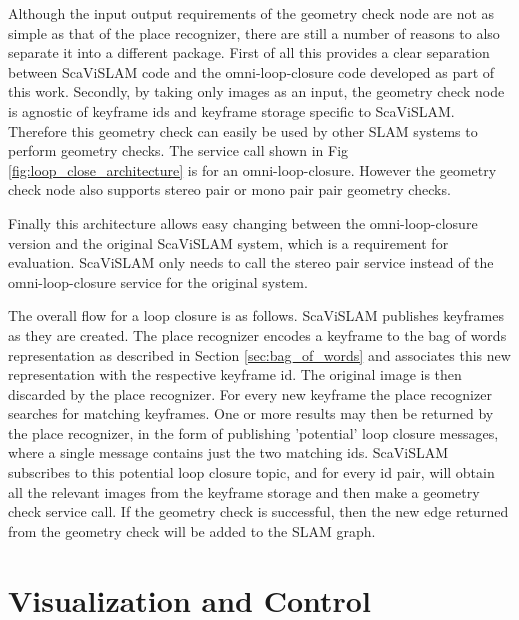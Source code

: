 Although the input output requirements of the geometry check node are not as simple as that of the place recognizer, there are still a number of reasons to also separate it into a different package.  First of all this provides a clear separation between ScaViSLAM code and the omni-loop-closure code developed as part of this work.  Secondly, by taking only images as an input, the geometry check node is agnostic of keyframe ids and keyframe storage specific to ScaViSLAM.  Therefore this geometry check can easily be used by other SLAM systems to perform geometry checks.  The service call shown in Fig \ref{fig:loop_close_architecture} is for an omni-loop-closure.  However the geometry check node also supports stereo pair or mono pair pair geometry checks.  

Finally this architecture allows easy changing between the omni-loop-closure version and the original ScaViSLAM system, which is a requirement for evaluation.  ScaViSLAM only needs to call the stereo pair service instead of the omni-loop-closure service for the original system.

The overall flow for a loop closure is as follows.  ScaViSLAM publishes keyframes as they are created.  The place recognizer encodes a keyframe to the bag of words representation as described in Section \ref{sec:bag_of_words} and associates this new representation with the respective keyframe id.  The original image is then discarded by the place recognizer.  For every new keyframe the place recognizer searches for matching keyframes.  One or more results may then be returned by the place recognizer, in the form of publishing 'potential' loop closure messages, where a single message contains just the two matching ids.  ScaViSLAM subscribes to this potential loop closure topic, and for every id pair, will obtain all the relevant images from the keyframe storage and then make a geometry check service call.  If the geometry check is successful, then the new edge returned from the geometry check will be added to the SLAM graph.

\section{Visualization and Control}
\label{sec:visualization_and_control}

